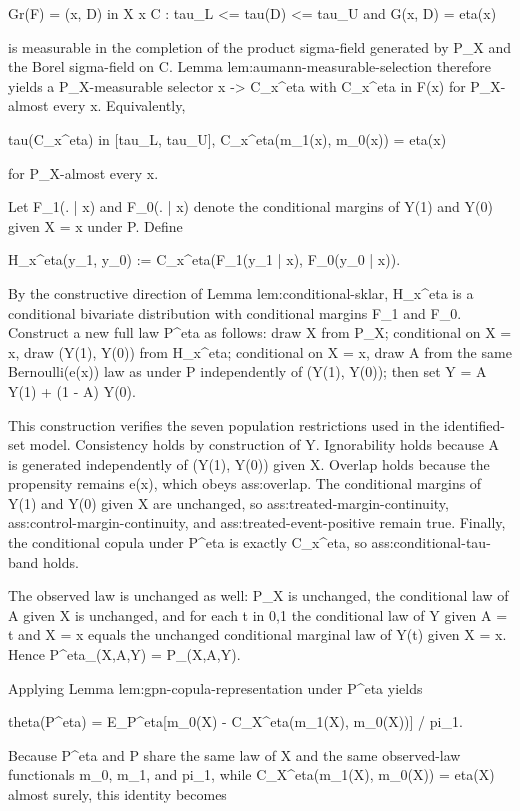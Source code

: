 \documentclass{article}
\begin{document}
Gr(F) = {(x, D) in X x C : tau_L <= tau(D) <= tau_U and G(x, D) = eta(x)}

is measurable in the completion of the product sigma-field generated by P_X and the Borel sigma-field on C. Lemma lem:aumann-measurable-selection therefore yields a P_X-measurable selector x -> C_x^eta with C_x^eta in F(x) for P_X-almost every x. Equivalently,

tau(C_x^eta) in [tau_L, tau_U],
C_x^eta(m_1(x), m_0(x)) = eta(x)

for P_X-almost every x.

Let F_1(. | x) and F_0(. | x) denote the conditional margins of Y(1) and Y(0) given X = x under P. Define

H_x^eta(y_1, y_0) := C_x^eta(F_1(y_1 | x), F_0(y_0 | x)).

By the constructive direction of Lemma lem:conditional-sklar, H_x^eta is a conditional bivariate distribution with conditional margins F_1 and F_0. Construct a new full law P^eta as follows: draw X from P_X; conditional on X = x, draw (Y(1), Y(0)) from H_x^eta; conditional on X = x, draw A from the same Bernoulli(e(x)) law as under P independently of (Y(1), Y(0)); then set Y = A Y(1) + (1 - A) Y(0).

This construction verifies the seven population restrictions used in the identified-set model. Consistency holds by construction of Y. Ignorability holds because A is generated independently of (Y(1), Y(0)) given X. Overlap holds because the propensity remains e(x), which obeys ass:overlap. The conditional margins of Y(1) and Y(0) given X are unchanged, so ass:treated-margin-continuity, ass:control-margin-continuity, and ass:treated-event-positive remain true. Finally, the conditional copula under P^eta is exactly C_x^eta, so ass:conditional-tau-band holds.

The observed law is unchanged as well: P_X is unchanged, the conditional law of A given X is unchanged, and for each t in {0,1} the conditional law of Y given A = t and X = x equals the unchanged conditional marginal law of Y(t) given X = x. Hence P^eta_(X,A,Y) = P_(X,A,Y).

Applying Lemma lem:gpn-copula-representation under P^eta yields

theta(P^eta) = E_{P^eta}[m_0(X) - C_X^eta(m_1(X), m_0(X))] / pi_1.

Because P^eta and P share the same law of X and the same observed-law functionals m_0, m_1, and pi_1, while C_X^eta(m_1(X), m_0(X)) = eta(X) almost surely, this identity becomes
\end{document}
